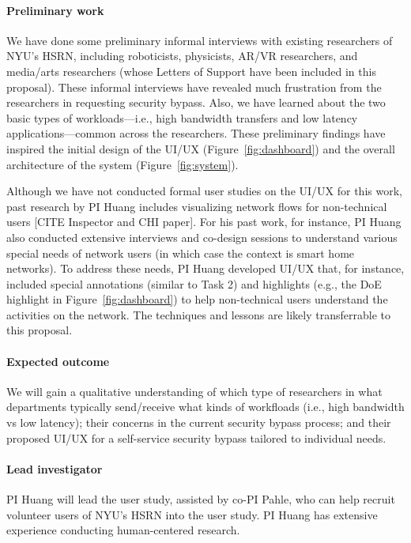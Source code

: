 \paragraph{Preliminary work}
We have done some preliminary informal interviews with existing researchers of NYU's HSRN, including roboticists, physicists, AR/VR researchers, and media/arts researchers (whose Letters of Support have been included in this proposal). These informal interviews have revealed much frustration from the researchers in requesting security bypass. Also, we have learned about the two basic types of workloads---i.e., high bandwidth transfers and low latency applications---common across the researchers. These preliminary findings have inspired the initial design of the UI/UX (Figure~\ref{fig:dashboard}) and the overall architecture of the system (Figure~\ref{fig:system}).

Although we have not conducted formal user studies on the UI/UX for this work, past research by PI Huang includes visualizing network flows for non-technical users [CITE Inspector and CHI paper]. For his past work, for instance, PI Huang also conducted extensive interviews and co-design sessions to understand various special needs of network users (in which case the context is smart home networks). To address these needs, PI Huang developed UI/UX that, for instance, included special annotations (similar to Task 2) and highlights (e.g., the DoE highlight in Figure~\ref{fig:dashboard}) to help non-technical users understand the activities on the network. The techniques and lessons are likely transferrable to this proposal.

\paragraph{Expected outcome} We will gain a qualitative understanding of which type of researchers in what departments typically send/receive what kinds of workfloads (i.e., high bandwidth vs low latency); their concerns in the current security bypass process; and their proposed UI/UX for a self-service security bypass tailored to individual needs.



\paragraph{Lead investigator}
PI Huang will lead the user study, assisted by co-PI Pahle, who can help recruit volunteer users of NYU's HSRN into the user study. PI Huang has extensive experience conducting human-centered research.










